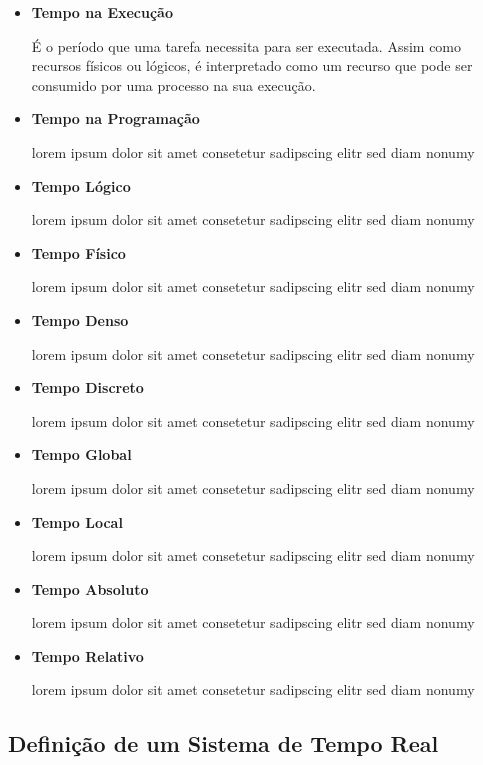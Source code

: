 \begin{itemize}
\item \textbf{Tempo na Execução}

É o período que uma tarefa necessita para ser executada. Assim como recursos
físicos ou lógicos, é interpretado como um recurso que pode ser consumido
por uma processo na sua execução.

\item \textbf{Tempo na Programação}

lorem ipsum dolor sit amet consetetur sadipscing elitr sed diam nonumy

\item \textbf{Tempo Lógico}

lorem ipsum dolor sit amet consetetur sadipscing elitr sed diam nonumy

\item \textbf{Tempo Físico}

lorem ipsum dolor sit amet consetetur sadipscing elitr sed diam nonumy

\item \textbf{Tempo Denso}

lorem ipsum dolor sit amet consetetur sadipscing elitr sed diam nonumy

\item \textbf{Tempo Discreto}

lorem ipsum dolor sit amet consetetur sadipscing elitr sed diam nonumy

\item \textbf{Tempo Global}

lorem ipsum dolor sit amet consetetur sadipscing elitr sed diam nonumy

\item \textbf{Tempo Local}

lorem ipsum dolor sit amet consetetur sadipscing elitr sed diam nonumy

\item \textbf{Tempo Absoluto}

lorem ipsum dolor sit amet consetetur sadipscing elitr sed diam nonumy

\item \textbf{Tempo Relativo}

lorem ipsum dolor sit amet consetetur sadipscing elitr sed diam nonumy

\end{itemize}

\subsection{Definição de um Sistema de Tempo Real}
